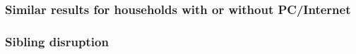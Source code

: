 \documentclass{beamer}
\begin{document}
\begin{frame}
    \label{frame:pcinternet_siblings}
    \frametitle{Similar results for households with or without PC/Internet}
        {
    }

    \begin{flushleft}
        \hyperlink{frame:pcinternet}{}
    \end{flushleft}       

\end{frame}

\begin{frame}
    \label{frame:siblingdisruption_siblings}
    \frametitle{Sibling disruption}
        {
    }

    \begin{flushleft}
        \hyperlink{frame:siblingdisruption}{}
    \end{flushleft}        

\end{frame}
\end{document}
